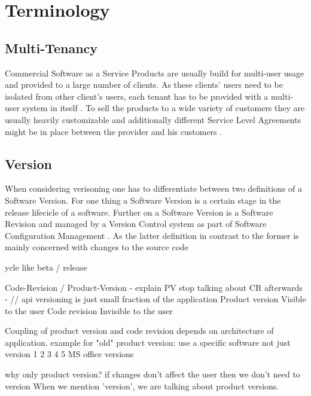 \section{Terminology}
\label{sec:terminology}

\subsection{Multi-Tenancy}

Commercial Software as a Service Products are usually build for multi-user usage and provided to a large number of clients. As these clients' users need to be isolated from other client's users, each tenant has to be provided with a multi-user system in itself \cite{Chong2006a}. To sell the products to a wide variety of customers they are usually heavily customizable and additionally different Service Level Agreements might be in place between the provider and his customers \cite{Bezemer2010}.

\subsection{Version}

When considering verisoning one has to differentiate between two definitions of a Software Version.
For one thing a Software Version is a certain stage in the release lifecicle of a software.
Further on a Software Version is a Software Revision and managed by a Version Control system as part of Software Configuration Management \cite{swebook}.
As the latter definition in contrast to the former is mainly concerned with changes to the source code 

ycle like beta / release


Code-Revision / Product-Version
  - explain PV stop talking about CR afterwards
  - // api versioning is just small fraction of the application
  Product version Visible to the user
  Code revision   Invisible to the user

  Coupling of product version and code revision depends on architecture of application.
  example for "old" product version: use a specific software not just version 1 2 3 4 5
  MS office versions

  why only product version?
  if changes don't affect the user then we don't need to version
  When we mention 'version', we are talking about product versions.

